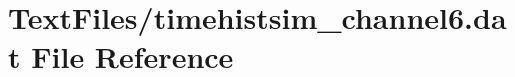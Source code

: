 \hypertarget{TextFiles_2timehistsim__channel6_8dat}{}\section{Text\+Files/timehistsim\+\_\+channel6.dat File Reference}
\label{TextFiles_2timehistsim__channel6_8dat}
